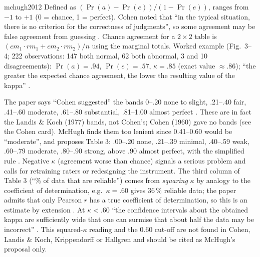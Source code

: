 \begin{papercard}{mchugh2012}
 Defined as $(\Pr(a)-\Pr(e))/(1-\Pr(e))$, ranges from $-1$ to $+1$ (0 = chance, 1 = perfect). Cohen noted that ``in the typical situation, there is no criterion for the correctness of judgments'', so some agreement may be false agreement from guessing . Chance agreement for a $2\times2$ table is $(cm_1\cdot rm_1+cm_2\cdot rm_2)/n$ using the marginal totals. Worked example (Fig.\ 3--4; 222 observations: 147 both normal, 62 both abnormal, 3 and 10 disagreements): $\Pr(a)=.94$, $\Pr(e)=.57$, $\kappa=.85$ (exact value $\approx.86$); ``the greater the expected chance agreement, the lower the resulting value of the kappa'' .

 The paper says ``Cohen suggested'' the bands 0--.20 none to slight, .21--.40 fair, .41--.60 moderate, .61--.80 substantial, .81--1.00 almost perfect . These are in fact the Landis \& Koch (1977) bands, not Cohen's; Cohen (1960) gave no bands (see the Cohen card). McHugh finds them too lenient since 0.41--0.60 would be ``moderate'', and proposes Table 3: .00--.20 none, .21--.39 minimal, .40--.59 weak, .60--.79 moderate, .80--.90 strong, above .90 almost perfect, with the simplified rule . Negative $\kappa$ (agreement worse than chance) signals a serious problem and calls for retraining raters or redesigning the instrument. The third column of Table 3 (``\% of data that are reliable'') comes from \emph{squaring} $\kappa$ by analogy to the coefficient of determination, e.g.\ $\kappa=.60$ gives 36\,\% reliable data; the paper admits that only Pearson $r$ has a true coefficient of determination, so this is an estimate by extension . At $\kappa<.60$ ``the confidence intervals about the obtained kappa are sufficiently wide that one can surmise that about half the data may be incorrect'' . This squared-$\kappa$ reading and the 0.60 cut-off are not found in Cohen, Landis \& Koch, Krippendorff or Hallgren and should be cited as McHugh's proposal only.


\end{papercard}
